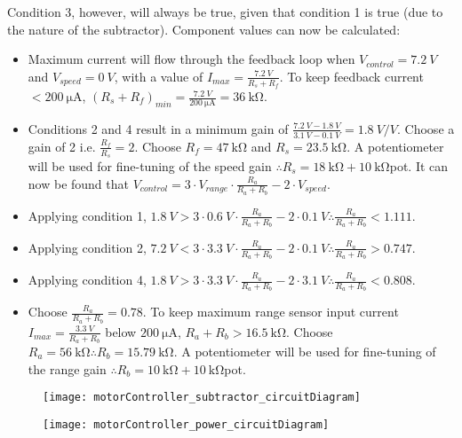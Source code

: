 \indent Condition 3, however, will always be true, given that condition 1 is true (due to the nature of the subtractor). Component values can now be calculated:
\begin{itemize}
    \item Maximum current will flow through the feedback loop when $V_{control} = \SI{7.2}{V}$ and $V_{speed} = \SI{0}{V}$, with a value of $I_{max} = \frac{\SI{7.2}{V}}{R_s + R_f}$.
          To keep feedback current $< \SI{200}{\micro\ampere}$, $(R_s + R_f)_{min} = \frac{\SI{7.2}{V}}{\SI{200}{\micro\ampere}} = \SI{36}{\kilo\ohm}$.
    \item Conditions 2 and 4 result in a minimum gain of $\frac{\SI{7.2}{V} - \SI{1.8}{V}}{\SI{3.1}{V} - \SI{0.1}{V}} = \SI{1.8}{V/V}$. Choose a gain of 2 i.e. $\frac{R_f}{R_s} = 2$.
          Choose $R_f = \SI{47}{\kilo\ohm}$ and $R_s = \SI{23.5}{\kilo\ohm}$. A potentiometer will be used for fine-tuning of the speed gain $\therefore R_s = \SI{18}{\kilo\ohm} + \SI{10}{\kilo\ohm}$pot.
          It can now be found that $V_{control} = 3 \cdot V_{range} \cdot \frac{R_a}{R_a + R_b} - 2 \cdot V_{speed}$.
    \item Applying condition 1, $\SI{1.8}{V} > 3 \cdot \SI{0.6}{V} \cdot \frac{R_a}{R_a + R_b} - 2 \cdot \SI{0.1}{V} \therefore \frac{R_a}{R_a + R_b} < 1.111$.
    \item Applying condition 2, $\SI{7.2}{V} < 3 \cdot \SI{3.3}{V} \cdot \frac{R_a}{R_a + R_b} - 2 \cdot \SI{0.1}{V} \therefore \frac{R_a}{R_a + R_b} > 0.747$.
    \item Applying condition 4, $\SI{1.8}{V} > 3 \cdot \SI{3.3}{V} \cdot \frac{R_a}{R_a + R_b} - 2 \cdot \SI{3.1}{V} \therefore \frac{R_a}{R_a + R_b} < 0.808$.
    \item Choose $\frac{R_a}{R_a + R_b} = 0.78$. To keep maximum range sensor input current $I_{max} = \frac{\SI{3.3}{V}}{R_a + R_b}$ below $\SI{200}{\micro\ampere}$, $R_a + R_b > \SI{16.5}{\kilo\ohm}$.
    Choose $R_a = \SI{56}{\kilo\ohm} \therefore R_b = \SI{15.79}{\kilo\ohm}$. A potentiometer will be used for fine-tuning of the range gain $\therefore R_b = \SI{10}{\kilo\ohm} + \SI{10}{\kilo\ohm}$pot.
\end{itemize}

\begin{figure}[!htb]
    \centering
    \begin{minipage}{.6\textwidth}
        \centering
        \texttt{[image: motorController\_subtractor\_circuitDiagram]}
        \label{fig:motorController_subtractor_circuitDiagram}
    \end{minipage}
    \begin{minipage}{.35\textwidth}
        \centering
        \texttt{[image: motorController\_power\_circuitDiagram]}
        \label{fig:motorController_power_circuitDiagram}
    \end{minipage}
\end{figure}